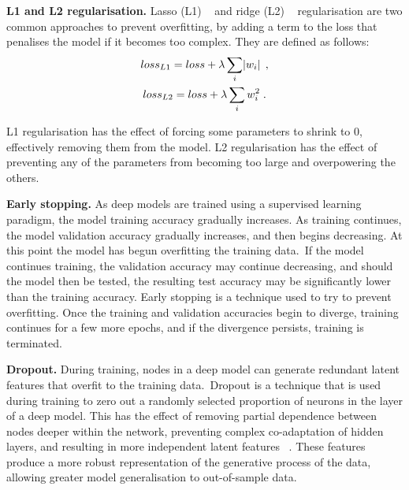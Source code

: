 \noindent \textbf{L1 and L2 regularisation.} Lasso (L1) \unskip ~\citep{tibshirani1996regression} and ridge (L2) \unskip ~\citep{hoerl1970ridge} regularisation are two common approaches to prevent overfitting, by adding a term to the loss that penalises the model if it becomes too complex. They are defined as follows:
\begin{subequations}
	\begin{gather}
		loss_{L1} = loss + \lambda\sum_i\abs{w_i} \; ,  \\
		loss_{L2} = loss + \lambda\sum_iw_i^2 \; .
	\end{gather}
\end{subequations}

\noindent L1 regularisation has the effect of forcing some parameters to shrink to 0, effectively removing them from the model. L2 regularisation has the effect of preventing any of the parameters from becoming too large and overpowering the others. \par

\noindent \textbf{Early stopping.} As deep models are trained using a supervised learning paradigm, the model training accuracy gradually increases. As training continues, the model validation accuracy gradually increases, and then begins decreasing. At this point the model has begun overfitting the training data.\ If the model continues training, the validation accuracy may continue decreasing, and should the model then be tested, the resulting test accuracy may be significantly lower than the training accuracy. Early stopping is a technique used to try to prevent overfitting. Once the training and validation accuracies begin to diverge, training continues for a few more epochs, and if the divergence persists, training is terminated. \par

\noindent \textbf{Dropout.} During training, nodes in a deep model can generate redundant latent features that overfit to the training data.\ Dropout is a technique that is used during training to zero out a randomly selected proportion of neurons in the layer of a deep model. This has the effect of removing partial dependence between nodes deeper within the network, preventing complex co-adaptation of hidden layers, and resulting in more independent latent features \unskip ~\citep{hinton2012improving}. These features produce a more robust representation of the generative process of the data, allowing greater model generalisation to out-of-sample data. \par


